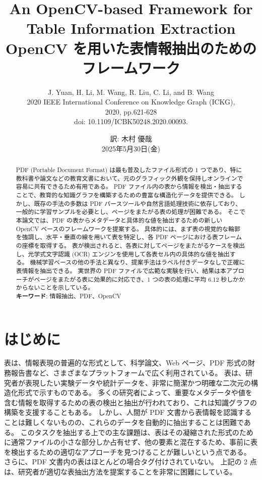 \documentclass[uplatex, twocolumn,10pt]{jsarticle}
\begin{document}
\title{
    \bf{
        \LARGE{An OpenCV-based Framework for Table Information Extraction} \\
        \Large{OpenCV を用いた表情報抽出のためのフレームワーク}
    }
}
\author{J. Yuan, H. Li, M. Wang, R. Liu, C. Li, and B. Wang \\
    2020 IEEE International Conference on Knowledge Graph (ICKG), \\
    2020, pp.621-628 \\
    doi: 10.1109/ICBK50248.2020.00093.}
\date{訳: 木村 優哉 \\ 2025年5月30日(金)}

\maketitle


\begin{abstract}
    PDF (Portable Document Format) は最も普及したファイル形式の 1 つであり、特に教科書や論文などの教育文書において、元のグラフィック外観を保持しオンラインで容易に共有できるため有用である。
    PDF ファイル内の表から情報を検出・抽出することで、教育的な知識グラフを構築するための豊富な構造化データを提供できる。
    しかし、既存の手法の多数は PDF パースツールや自然言語処理技術に依存しており、一般的に学習サンプルを必要とし、ページをまたがる表の処理が困難である。
    そこで本論文では、PDF の表からメタデータと具体的な値を抽出するための新しい OpenCV ベースのフレームワークを提案する。
    具体的には、まず表の視覚的な輪郭を強調し、水平・垂直の線を用いて表を特定し、各 PDF ページにおける表フレームの座標を取得する。
    表が検出されると、各表に対してページをまたがるケースを検出し、光学式文字認識 (OCR) エンジンを使用して各表セル内の具体的な値を抽出する。
    機械学習ベースの他の手法と異なり、提案手法はラベル付きデータなしで正確に表情報を抽出できる。
    実世界の PDF ファイルで広範な実験を行い、結果は本アプローチがページをまたがる表に効果的に対応でき、1 つの表の処理に平均 6.12 秒しかかからないことを示している。\\
    \textbf{キーワード}: 情報抽出、PDF、OpenCV
\end{abstract}



\section{はじめに}

表は、情報表現の普遍的な形式として、科学論文、Web ページ、PDF 形式の財務報告書など、さまざまなプラットフォームで広く利用されている。
表は、研究者が表現したい実験データや統計データを、非常に簡潔かつ明確な二次元の構造化形式で示すものである。
多くの研究者によって、重要なメタデータや値を含む情報を取得するための表の検出と抽出が行われており、これは知識グラフの構築を支援することもある。
しかし、人間が PDF 文書から表情報を認識することは難しくないものの、これらのデータを自動的に抽出することは困難である。
このタスクを抽出する上での主な課題は、表はその凝縮された形式のために通常ファイルの小さな部分しか占有せず、他の要素と混在するため、事前に表を検出するための適切なアプローチを見つけることが難しいという点である。
さらに、PDF 文書内の表はほとんどの場合タグ付けされていない。
上記の 2 点は、研究者が適切な表抽出方法を提案することを非常に困難にしている。
\end{document}
